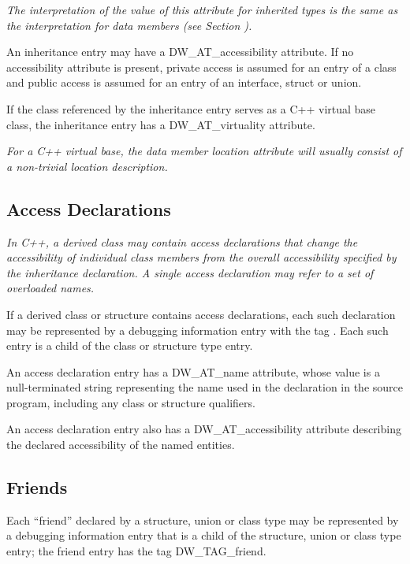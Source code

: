 \textit{The interpretation of the value of this attribute for
inherited types is the same as the interpretation for data
members 
(see Section ).  }

An inheritance entry may have a
DW\_AT\_accessibility attribute. If no accessibility attribute
is present, private access is assumed for an entry of a class
and public access is assumed for an entry of an interface,
struct or union.

If the class referenced by the inheritance entry serves
as a C++ virtual base class, the inheritance entry has a
DW\_AT\_virtuality attribute.

\textit{For a C++ virtual base, the data member location attribute
will usually consist of a non-trivial location description.}

\subsection{Access Declarations}
\label{chap:accessdeclarations}

\textit{In C++, a derived class may contain access declarations that
change the accessibility of individual class members from the
overall accessibility specified by the inheritance declaration.
A single access declaration may refer to a set of overloaded
names.}

If a derived class or structure contains access declarations,
each such declaration may be represented by a debugging
information entry with the tag 
. 
Each
such entry is a child of the class or structure type entry.

An access declaration entry has a DW\_AT\_name attribute, whose
value is a null-terminated string representing the name used
in the declaration in the source program, including any class
or structure qualifiers.

An access declaration entry also has a DW\_AT\_accessibility
attribute describing the declared accessibility of the named
entities.


\subsection{Friends}
\label{chap:friends}

Each ``friend'' declared by a structure, union or class
type may be represented by a debugging information entry
that is a child of the structure, union or class type entry;
the friend entry has the tag DW\_TAG\_friend.


